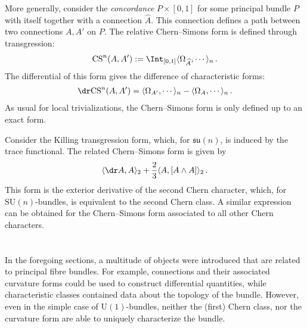     More generally, consider the \textit{concordance} $P\times[0,1]$ for some principal bundle $P$ with itself together with a connection $\widehat{A}$. This connection defines a path between two connections $A,A'$ on $P$. The relative Chern--Simons form is defined through transgression:
    \begin{gather}
        \mathrm{CS}^n(A,A') := \Int_{[0,1]}\langle\Omega_{\widehat{A}},\cdots\rangle_n\,.
    \end{gather}
    The differential of this form gives the difference of characteristic forms:
    \begin{gather}
        \dr\mathrm{CS}^n(A,A') = \langle\Omega_{A'},\cdots\rangle_n - \langle\Omega_A,\cdots\rangle_n\,.
    \end{gather}
    As usual for local trivializations, the Chern--Simons form is only defined up to an exact form.

    \begin{example}\label{bundle:killing_transgression}
        Consider the Killing transgression form, which, for $\mathfrak{su}(n)$, is induced by the trace functional. The related Chern--Simons form is given by
        \begin{gather}
            \langle\dr A,A\rangle_2 + \frac{2}{3}\langle A,[A\wedge A] \rangle_2\,.
        \end{gather}
        This form is the exterior derivative of the second Chern character, which, for $\mathrm{SU}(n)$-bundles, is equivalent to the second Chern class. A similar expression can be obtained for the Chern--Simons form associated to all other Chern characters.
    \end{example}

\section{}\label{section:differential_cohomology}

    In the foregoing sections, a multitude of objects were introduced that are related to principal fibre bundles. For example, connections and their associated curvature forms could be used to construct differential quantities, while characteristic classes contained data about the topology of the bundle. However, even in the simple case of $\mathrm{U}(1)$-bundles, neither the (first) Chern class, nor the curvature form are able to uniquely characterize the bundle.

